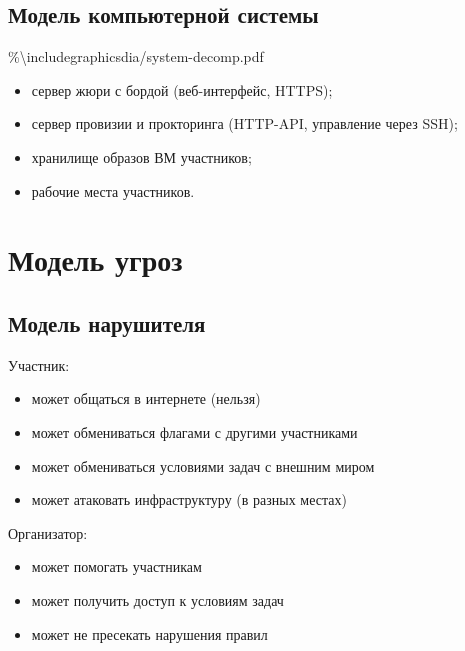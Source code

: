 \subsection{Модель компьютерной системы}

\%\textbackslash includegraphics{dia/system-decomp.pdf}

\begin{itemize}
\item
  сервер жюри с бордой (веб-интерфейс, HTTPS);
\item
  сервер провизии и прокторинга (HTTP-API, управление через SSH);
\item
  хранилище образов ВМ участников;
\item
  рабочие места участников.
\end{itemize}

\section{Модель угроз}

\subsection{Модель нарушителя}

Участник:
\begin{itemize}
\item
  может общаться в интернете (нельзя)
\item
  может обмениваться флагами с другими участниками
\item
  может обмениваться условиями задач с внешним миром
\item
  может атаковать инфраструктуру (в разных местах)
\end{itemize}

Организатор:
\begin{itemize}
\item может помогать участникам
\item может получить доступ к условиям задач
\item может не пресекать нарушения правил
\end{itemize}
